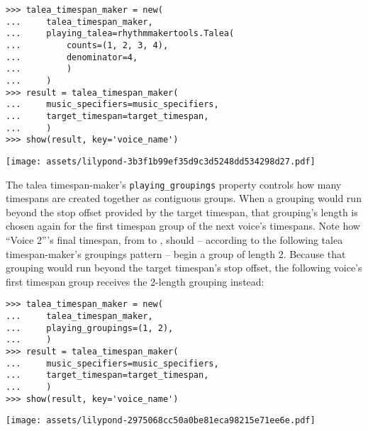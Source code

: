\begin{comment}
<abjad>
talea_timespan_maker = new(
    talea_timespan_maker,
    playing_talea=rhythmmakertools.Talea(
        counts=(1, 2, 3, 4),
        denominator=4,
        )
    )
result = talea_timespan_maker(
    music_specifiers=music_specifiers,
    target_timespan=target_timespan,
    )
show(result, key='voice_name')
</abjad>
\end{comment}

\begin{abjadbookoutput}
\begin{singlespacing}
\vspace{-0.5\baselineskip}
\begin{verbatim}
>>> talea_timespan_maker = new(
...     talea_timespan_maker,
...     playing_talea=rhythmmakertools.Talea(
...         counts=(1, 2, 3, 4),
...         denominator=4,
...         )
...     )
>>> result = talea_timespan_maker(
...     music_specifiers=music_specifiers,
...     target_timespan=target_timespan,
...     )
>>> show(result, key='voice_name')
\end{verbatim}
\noindent\texttt{[image: assets/lilypond-3b3f1b99ef35d9c3d5248dd534298d27.pdf]}
\end{singlespacing}
\end{abjadbookoutput}

\noindent The talea timespan-maker's \texttt{playing\_groupings} property
controls how many timespans are created together as contiguous groups. When a
grouping would run beyond the stop offset provided by the target timespan, that
grouping's length is chosen again for the first timespan group of the next
voice's timespans. Note how \enquote{Voice 2}'s final timespan, from
 to , should -- according to the following talea
timespan-maker's groupings pattern -- begin a group of length 2. Because that
grouping would run beyond the target timespan's  stop offset, the
following voice's first timespan group receives the 2-length grouping instead:

\begin{comment}
<abjad>
talea_timespan_maker = new(
    talea_timespan_maker,
    playing_groupings=(1, 2),
    )
result = talea_timespan_maker(
    music_specifiers=music_specifiers,
    target_timespan=target_timespan,
    )
show(result, key='voice_name')
</abjad>
\end{comment}

\begin{abjadbookoutput}
\begin{singlespacing}
\vspace{-0.5\baselineskip}
\begin{verbatim}
>>> talea_timespan_maker = new(
...     talea_timespan_maker,
...     playing_groupings=(1, 2),
...     )
>>> result = talea_timespan_maker(
...     music_specifiers=music_specifiers,
...     target_timespan=target_timespan,
...     )
>>> show(result, key='voice_name')
\end{verbatim}
\noindent\texttt{[image: assets/lilypond-2975068cc50a0be81eca98215e71ee6e.pdf]}
\end{singlespacing}
\end{abjadbookoutput}

